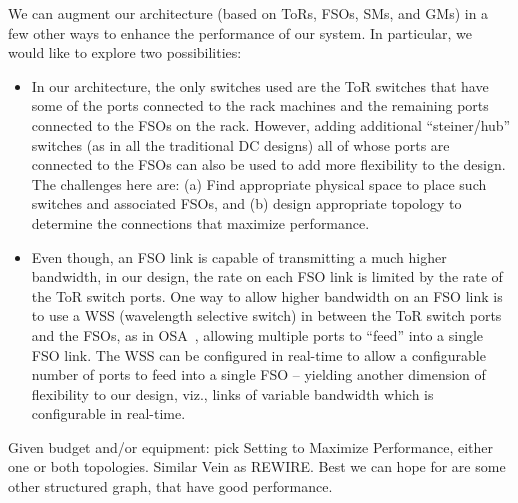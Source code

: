 We can augment our architecture (based on ToRs, FSOs, SMs, and GMs)
in a few other ways to enhance the performance of our system. In
particular, we would like to explore two possibilities:
\begin{itemize}
\item
In our architecture, the only switches used are the ToR switches that
have some of the ports connected to the rack machines and the
remaining ports connected to the FSOs on the rack. However, adding
additional ``steiner/hub'' switches (as in all the traditional DC
designs) all of whose ports are connected to the FSOs can also be used
to add more flexibility to the design.  The challenges here are: (a)
Find appropriate physical space to place such switches and associated
FSOs, and (b) design appropriate topology to determine the connections
that maximize performance. 

\item
Even though, an FSO link is capable of transmitting a much higher
bandwidth, in our design, the rate on each FSO link is limited by the
rate of the ToR switch ports. One way to allow higher bandwidth on an
FSO link is to use a WSS (wavelength selective switch) in between the
ToR switch ports and the FSOs, as in OSA~\cite{}, allowing multiple
ports to ``feed'' into a single FSO link. The WSS can be configured
in real-time to allow a configurable number of ports to feed into
a single FSO -- yielding another dimension of flexibility to our 
design, viz., links of variable bandwidth which is configurable in
real-time.
\end{itemize}


Given budget and/or equipment: pick Setting to Maximize Performance, either one or both topologies.
Similar Vein as REWIRE. Best we can hope for are some other structured graph, that have good performance.

\vspace{2in}

